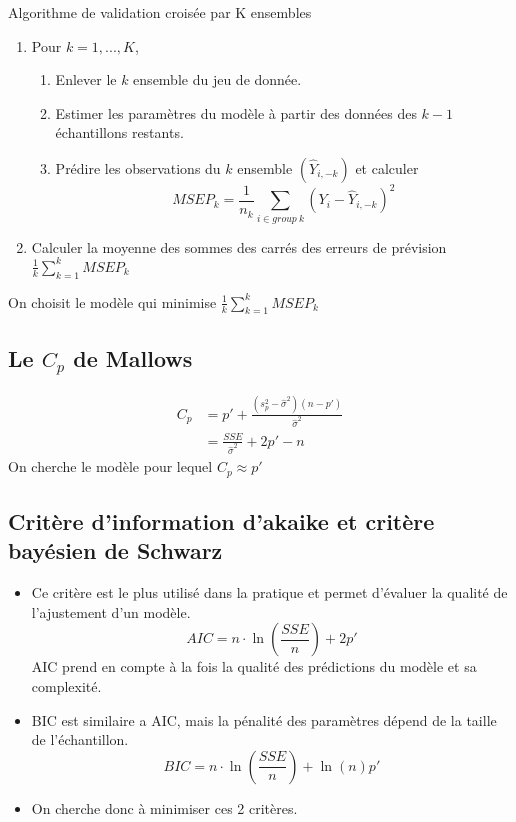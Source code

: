 \documentclass[10pt, french]{article}
\begin{document}
\begin{multicols*}{3}
\begin{algo}{Algorithme de validation croisée par K ensembles}
\begin{enumerate}
\item Pour $k = 1, ..., K$,
\begin{enumerate}[label=1.\arabic*]
	\item Enlever le $k$ ensemble du jeu de donnée.
	\item  Estimer les paramètres du modèle à partir des données des $k - 1$ échantillons restants.
	\item Prédire les observations du $k$ ensemble $(\hat{Y}_{i,-k})$ et calculer
	\[ MSEP_k = \frac{1}{n_k} \sum_{i\in group\:k} (Y_i - \hat{Y}_{i,-k})^2 \]
\end{enumerate}
	\item Calculer la moyenne des sommes des carrés des erreurs de prévision $\frac{1}{k} \sum_{k=1}^k MSEP_k$
\end{enumerate}
	On choisit le modèle qui minimise $\frac{1}{k} \sum_{k=1}^k MSEP_k$
\end{algo}

\subsection*{Le $C_p$ de Mallows}
\begin{align*}
C_p &= p' + \frac{(s_p^2 - \widehat{\sigma}^2)(n - p')}{\widehat{\sigma}^2} \\
&= \frac{SSE}{\widehat{\sigma}^2} + 2p' - n
\end{align*}
On cherche le modèle pour lequel $C_p \approx p'$

\subsection*{Critère d'information d'akaike et critère bayésien de Schwarz}
\begin{itemize}
\item Ce critère est le plus utilisé dans la pratique et permet d'évaluer la qualité de l'ajustement d'un modèle. 
\[ AIC = n \cdot \ln \left(\frac{SSE}{n}\right) + 2p' \]
AIC prend en compte à la fois la qualité des prédictions du modèle et sa complexité.
\item BIC est similaire a AIC, mais la pénalité des paramètres dépend de la taille de l'échantillon.
\[ BIC = n \cdot \ln \left(\frac{SSE}{n}\right) + \ln(n)p' \]
\item On cherche donc à minimiser ces 2 critères.
\end{itemize}


\end{multicols*}
\end{document}
